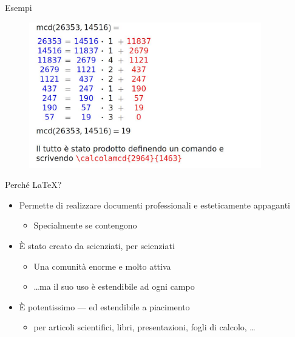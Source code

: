 \documentclass{beamer}
\begin{document}

\begin{frame}{Esempi}
\begin{figure}
\includegraphics[width=0.9\textwidth]{esempio4}
\end{figure}
\end{frame}

\begin{frame}{Perch\'e \LaTeX{}?}
\begin{itemize}
\item Permette di realizzare documenti professionali e esteticamente appaganti
\begin{itemize}
\item Specialmente se contengono 
\end{itemize}
%
\item \`E stato creato da scienziati, per scienziati
\begin{itemize}
\item Una comunit\`a enorme e molto attiva
\item \ldots ma il suo uso \`e estendibile ad ogni campo
\end{itemize}
%
\item \`E potentissimo --- ed estendibile a piacimento
\begin{itemize}
\item {} per articoli scientifici, libri, presentazioni,
fogli di calcolo, \ldots
\end{itemize}
\end{itemize}
\end{frame}
\end{document}
